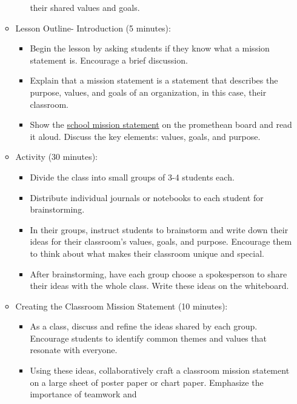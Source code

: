 \documentclass[14pt, letterpaper, twoside]{article}
\begin{document}
\begin{itemize}
\begin{itemize}
\begin{itemize}
													their shared values and goals.
									\end{itemize}
						\item Lesson Outline- Introduction (5 minutes):
									\begin{itemize}
										\item Begin the lesson by asking students if they know what a mission statement is.
													Encourage a brief discussion.
										\item Explain that a mission statement is a statement that describes the purpose,
													values, and goals of an organization, in this case, their classroom.
										\item Show the
													\href{https://www.ps192.org/apps/pages/index.jsp?uREC_ID=1504973&type=d&pREC_ID=1646782}{school mission statement} on the promethean board and read it aloud. Discuss the key
													elements: values, goals, and purpose.
									\end{itemize}
						\item Activity (30 minutes):
									\begin{itemize}
										\item Divide the class into small groups of 3-4 students each.
										\item Distribute individual journals or notebooks to each student for brainstorming.
										\item In their groups, instruct students to brainstorm and write down their ideas for their
													classroom's values, goals, and purpose. Encourage them to think about what makes their
													classroom unique and special.
										\item After brainstorming, have each group choose a spokesperson to share their ideas
													with the whole class. Write these ideas on the whiteboard.
									\end{itemize}
									\newpage
						\item Creating the Classroom Mission Statement (10 minutes):
									\begin{itemize}
										\item As a class, discuss and refine the ideas shared by each group. Encourage students to
													identify common themes and values that resonate with everyone.
										\item Using these ideas, collaboratively craft a classroom mission statement on a large
													sheet of poster paper or chart paper. Emphasize the importance of teamwork and

\end{itemize}
\end{itemize}
\end{itemize}
\end{document}
